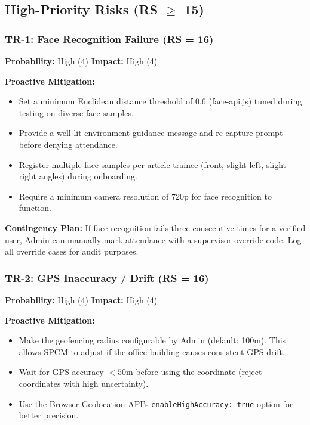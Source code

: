 \documentclass[12pt,a4paper]{article}
\begin{document}
\subsection{High-Priority Risks (RS $\geq$ 15)}

\subsubsection*{TR-1: Face Recognition Failure (RS = 16)}
\textbf{Probability:} High (4) \quad \textbf{Impact:} High (4)

\textbf{Proactive Mitigation:}
\begin{itemize}[noitemsep]
    \item Set a minimum Euclidean distance threshold of 0.6 (face-api.js) tuned during testing on diverse face samples.
    \item Provide a well-lit environment guidance message and re-capture prompt before denying attendance.
    \item Register multiple face samples per article trainee (front, slight left, slight right angles) during onboarding.
    \item Require a minimum camera resolution of 720p for face recognition to function.
\end{itemize}

\textbf{Contingency Plan:}
If face recognition fails three consecutive times for a verified user, Admin can manually mark attendance with a supervisor override code. Log all override cases for audit purposes.

\bigskip
\subsubsection*{TR-2: GPS Inaccuracy / Drift (RS = 16)}
\textbf{Probability:} High (4) \quad \textbf{Impact:} High (4)

\textbf{Proactive Mitigation:}
\begin{itemize}[noitemsep]
    \item Make the geofencing radius configurable by Admin (default: 100m). This allows SPCM to adjust if the office building causes consistent GPS drift.
    \item Wait for GPS accuracy $< 50$m before using the coordinate (reject coordinates with high uncertainty).
    \item Use the Browser Geolocation API's \texttt{enableHighAccuracy: true} option for better precision.
\end{itemize}
\end{document}
